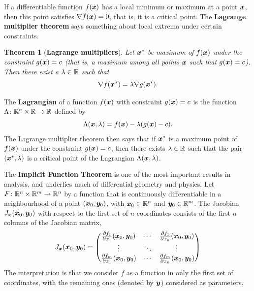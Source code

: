 \documentclass[11pt,a4paper]{memoir}
\newtheorem*{theorem*}{Theorem}
\begin{document}
If a differentiable function $f(\bm{x})$ has a local minimum or maximum at a point $\bm{x}$, then this point satisfies $\nabla f(\bm{x})=0$,
that is, it is a critical point. 
The \textbf{Lagrange multiplier theorem} says something about local extrema under certain constraints.

\begin{theorem*}[\textbf{Lagrange multipliers}]
Let $\bm{x}^*$ be maximum of $f(\bm{x})$ under the constraint $g(\bm{x})=c$ (that is, a maximum among all points $\bm{x}$ such that $g(\bm{x})=c$). Then there exist a $\lambda\in \mathbb{R}$ 
such that
\begin{equation*}
  \nabla f(\bm{x}^*) = \lambda \nabla g(\bm{x}^*).
\end{equation*}
\end{theorem*}

The \textbf{Lagrangian} of a function $f(\bm{x})$ with constraint $g(\bm{x})=c$ is the function $\Lambda \colon \mathbb{R}^n\times \mathbb{R}\rightarrow \mathbb{R}$ defined by
\begin{equation*}
  \Lambda(\bm{x},\lambda) = f(\bm{x})-\lambda (g(\bm{x})-c).
\end{equation*}
The Lagrange multiplier theorem then says that if $\bm{x}^*$ is a maximum point of $f(\bm{x})$ under the constraint $g(\bm{x})=c$, then there exists $\lambda\in \mathbb{R}$ such that the pair $(\bm{x}^*,\lambda)$ is
a critical point of the Lagrangian $\Lambda(\bm{x},\lambda)$. 

The \textbf{Implicit Function Theorem} is one of the most important results in analysis, and underlies much of differential geometry and physics. 
Let $F\colon \mathbb{R}^{n}\times \mathbb{R}^{m}\to \mathbb{R}^n$ by a function that is continuously differentiable in a neighbourhood of a point $(\bm{x}_0,\bm{y}_0)$, with $\bm{x}_0\in \mathbb{R}^n$ and $\bm{y}_0\in \mathbb{R}^m$. The Jacobian $J_{\bm{x}}(\bm{x}_0,\bm{y}_0)$ with respect to the first set of $n$ coordinates consists of the first $n$ columns of the Jacobian matrix,
\begin{equation*}
 J_{\bm{x}}(\bm{x}_0,\bm{y}_0) = \begin{pmatrix}
                                     \frac{\partial f_1}{\partial x_1}(\bm{x}_0,\bm{y}_0) & \cdots & \frac{\partial f_1}{\partial x_n}(\bm{x}_0,\bm{y}_0)\\
                                     \vdots & \ddots & \vdots\\
                                     \frac{\partial f_m}{\partial x_1}(\bm{x}_0,\bm{y}_0) & \cdots & \frac{\partial f_m}{\partial x_n}(\bm{x}_0,\bm{y}_0)
                                    \end{pmatrix}
\end{equation*}
The interpretation is that we consider $f$ as a function in only the first set of coordinates, with the remaining ones (denoted by $\bm{y}$) considered as parameters.
\end{document}
